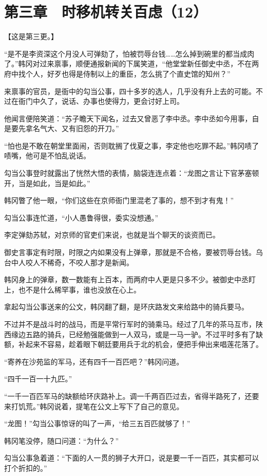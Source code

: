 \section{第三章　时移机转关百虑（12）}

【这是第三更。】

“是不是李资深这个月没人可弹劾了，怕被罚辱台钱……怎么掉到碗里的都当成肉了。”韩冈对过来禀事，顺便通报新闻的下属笑道，“他堂堂新任御史中丞，不在两府中找个人，好歹也得是侍制以上的重臣，怎么挑了个直史馆的知州？”

来禀事的官员，是衙中的勾当公事，四十多岁的选人，几乎没有升上去的可能。不过在衙门中久了，说话、办事也使得力，更会讨好上司。

他闻言便陪笑道：“苏子瞻天下闻名，过去又曾恶了李中丞。李中丞如今用事，自是要先拿名气大、又有旧怨的开刀。”

“怕也是不敢在朝堂里面闹，否则耽搁了伐夏之事，李定他也吃罪不起。”韩冈啧了啧嘴，他可是不怕乱说话。

勾当公事登时就露出了恍然大悟的表情，脑袋连连点着：“龙图之言让下官茅塞顿开，当是如此，当是如此。”

韩冈瞥了他一眼，“你们这些在京师衙门里混老了事的，想不到才有鬼！”

勾当公事连忙道，“小人愚鲁得很，委实没想通。”

李定弹劾苏轼，对京师的官吏们来说，也就是当个聊天的谈资而已。

御史言事定有时限，时限之内如果没有上弹章，那就是不合格，要被罚辱台钱。乌台中人咬人不稀奇，不咬人那才是新闻。

韩冈身上的弹章，数一数能有上百本，而两府中人更是只多不少。被御史中丞盯上，也不是什么稀罕事，谁也没放在心上。

拿起勾当公事送来的公文，韩冈翻了翻，是环庆路发文来给路中的骑兵要马。

不过并不是战斗时的战马，而是平常行军时的骑乘马。经过了几年的茶马互市，陕西缘边五路的骑兵，已经勉强能做到一人双马，或是一马一驴。不过平时多有了缺额，补起来不容易，趁着眼下朝廷要用兵于北的机会，便把手伸出来唱莲花落了。

“寄养在沙苑监的军马，还有四千一百匹吧？”韩冈问道。

“四千一百一十九匹。”

“一千一百匹军马的缺额给环庆路补上。调一千两百匹过去，省得半路死了，还要来打饥荒。”韩冈说着，提笔在公文上写下了自己的意见。

“龙图！”勾当公事惊讶的叫了一声，“给三五百匹就够了！”

韩冈笔没停，随口问道：“为什么？”

勾当公事急着道：“下面的人一贯的狮子大开口，说是要一千一百匹，其实都可以打个折扣的。”

